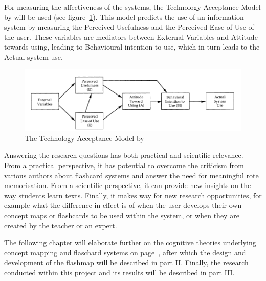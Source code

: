 For measuring the affectiveness of the systems, the Technology Acceptance Model by  will be used (see figure~\ref{fig:tam}). This model predicts the use of an information system by measuring the Perceived Usefulness and the Perceived Ease of Use of the user. These variables are mediators between External Variables and Attitude towards using, leading to Behavioural intention to use, which in turn leads to the Actual system use.

\begin{figure}
    \centering
    \includegraphics[width=\textwidth]{img/tam}
    \caption{The Technology Acceptance Model by \protect{}}
    \label{fig:tam}
\end{figure}

Answering the research questions has both practical and scientific relevance. From a practical perspective, it has potential to overcome the criticism from various authors about flashcard systems and answer the need for meaningful rote memorisation. From a scientific perspective, it can provide new insights on the way students learn texts. Finally, it makes way for new research opportunities, for example what the difference in effect is of when the user develops their own concept maps or flashcards to be used within the system, or when they are created by the teacher or an expert. 

The following chapter will elaborate further on the cognitive theories underlying concept mapping and flaschard systems on page~\pageref{ch:theory}, after which the design and development of the flashmap will be described in part II. Finally, the research conducted within this project and its results will be described in part III.
